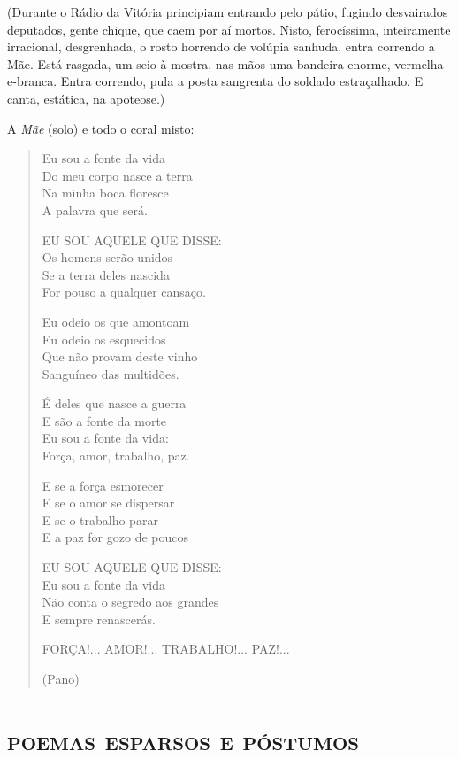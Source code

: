 \hfill\parbox{150pt}{
(Durante o Rádio da Vitória principiam entrando pelo pátio, fugindo
desvairados deputados, gente chique, que caem por aí mortos. Nisto,
ferocíssima, inteiramente irracional, desgrenhada, o rosto horrendo de
volúpia sanhuda, entra correndo a Mãe. Está rasgada, um seio à mostra,
nas mãos uma bandeira enorme, vermelha-e-branca. Entra correndo, pula a
posta sangrenta do soldado estraçalhado. E canta, estática, na
apoteose.)
}

A \emph{Mãe} (solo) e todo o coral misto:

\begin{verse}
Eu sou a fonte da vida\\
Do meu corpo nasce a terra\\
Na minha boca floresce\\
A palavra que será.

EU SOU AQUELE QUE DISSE:\\
Os homens serão unidos\\
Se a terra deles nascida\\
For pouso a qualquer cansaço.

Eu odeio os que amontoam\\
Eu odeio os esquecidos\\
Que não provam deste vinho\\
Sanguíneo das multidões.

É deles que nasce a guerra\\
E são a fonte da morte\\
Eu sou a fonte da vida:\\
Força, amor, trabalho, paz.

E se a força esmorecer\\
E se o amor se dispersar\\
E se o trabalho parar\\
E a paz for gozo de poucos

EU SOU AQUELE QUE DISSE:\\
Eu sou a fonte da vida\\
Não conta o segredo aos grandes\\
E sempre renascerás.

FORÇA!... AMOR!... TRABALHO!... PAZ!...

\hfill(Pano)
\end{verse}

\part{\textsc{poemas esparsos e póstumos}}

